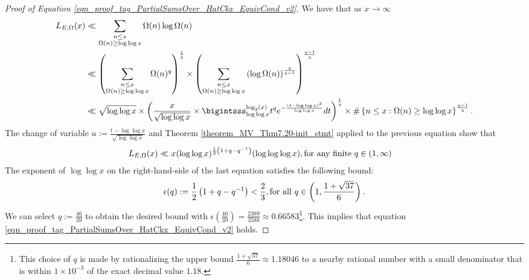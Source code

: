 \documentclass[11pt,reqno,a4letter]{article}
\newcommand{\hlocalref}[1]{\hyperref[#1]{\ref{#1}}}
\numberwithin{equation}{section}
\numberwithin{figure}{section}
\numberwithin{table}{section}
\theoremstyle{plain}
\numberwithin{theorem}{section}
\theoremstyle{definition}
\theoremstyle{remark}
\newcommand{\mathtext}[1]{\text{\rm #1}}
\begin{document}
\begin{proof}[Proof of Equation \eqref{eqn_proof_tag_PartialSumsOver_HatCkx_EquivCond_v2}]
We have that as $x \rightarrow \infty$ 
\begin{align*}
L_{E,\Omega}(x) & \ll \sum_{\substack{n \leq x \\ \Omega(n) \geq \log\log x}} 
	\Omega(n) \log \Omega(n) \\ 
	& \ll \left(\sum_{\substack{n \leq x \\ \Omega(n) \geq \log\log x}} 
	\Omega(n)^q\right)^{\frac{1}{q}} \times 
	\left(\sum_{\substack{n \leq x \\ \Omega(n) \geq \log\log x}} 
     \left(\log \Omega(n)\right)^{\frac{q}{q-1}}\right)^{\frac{q-1}{q}} \\ 
	& \ll \sqrt{\log\log x} \times 
	\left(\frac{x}{\sqrt{\log\log x}} \times \bigintsss_{\log\log x}^{\log_2(x)} t^q 
	e^{-\frac{\left(t-\log\log x\right)^2}{\log\log x}} dt\right)^{\frac{1}{q}} \times 
	\#\left\{n \leq x: \Omega(n) \geq \log\log x\right\}^{\frac{q-1}{q}}.
\end{align*} 
The change of variable $u := \frac{t-\log\log x}{\sqrt{\log\log x}}$ and 
Theorem \hlocalref{theorem_MV_Thm7.20-init_stmt} applied to the previous equation 
show that 
\begin{align*}
L_{E,\Omega}(x) & \ll 
     x (\log\log x)^{\frac{1}{2}\left(1 + q - q^{-1}\right)} (\log\log\log x), 
     \mathtext{ for any finite } q \in (1, \infty)
\end{align*}
The exponent of $\log\log x$ on the right-hand-side of the 
last equation satisfies the following bound: 
\[
\epsilon(q) := \frac{1}{2}\left(1 + q - q^{-1}\right) < \frac{2}{3},
     \mathtext{ for all } q \in \left(1, \frac{1 + \sqrt{37}}{6}\right). 
\]
We can select $q := \frac{46}{39}$ to obtain the desired bound with 
$\epsilon\left(\frac{46}{39}\right) = \frac{2389}{3588} \approx 0.66583$\footnote{
     This choice of $q$ is made by rationalizing the upper bound 
     $\frac{1 + \sqrt{37}}{6} \approx 1.18046$ to a nearby rational number with a 
     small denominator that is within $1 \times 10^{-3}$ of the exact decimal value $1.18$. 
}. 
This implies that equation \eqref{eqn_proof_tag_PartialSumsOver_HatCkx_EquivCond_v2} holds. 
\end{proof} 
\end{document}
